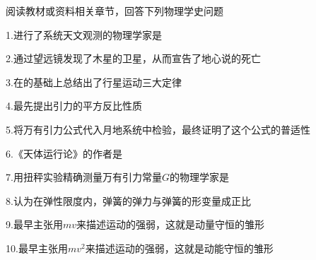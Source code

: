 阅读教材或资料相关章节，回答下列物理学史问题

	1.进行了系统天文观测的物理学家是\lunl{3em}

	2.\lunl{4em}通过望远镜发现了木星的卫星，从而宣告了地心说的死亡

	3.\lunl{4em}在\lunl{2em}的基础上总结出了行星运动三大定律

	4.\lunl{2em}最先提出引力的平方反比性质

	5.\lunl{2em}将万有引力公式代入月地系统中检验，最终证明了这个公式的普适性

	6.《天体运行论》的作者是\lunl{3em}

	7.用扭秤实验精确测量万有引力常量\(G\)的物理学家是\lunl{5em}

	8.\lunl{2em}认为在弹性限度内，弹簧的弹力与弹簧的形变量成正比

	9.\lunl{4em}最早主张用\(mv\)来描述运动的强弱，这就是动量守恒的雏形

	10.\lunl{5em}最早主张用\(mv^2\)来描述运动的强弱，这就是动能守恒的雏形